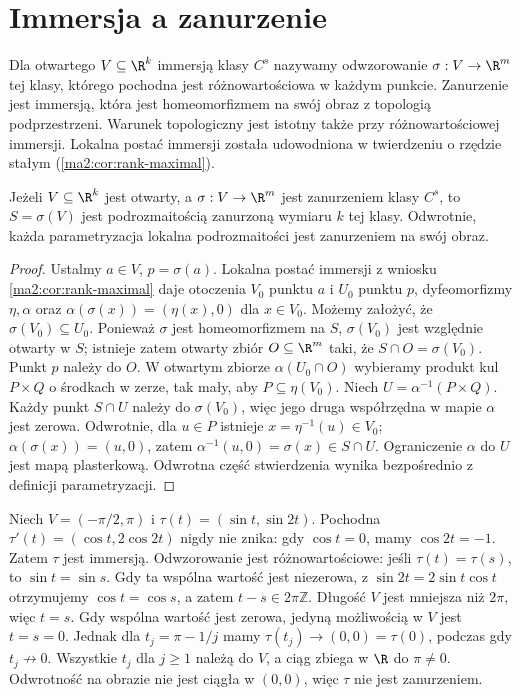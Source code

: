 \section{Immersja a zanurzenie}

Dla otwartego $V\subseteq\R^k$ immersją klasy $C^s$
nazywamy odwzorowanie $\sigma:V\to\R^m$ tej klasy,
którego pochodna jest różnowartościowa w każdym punkcie.
Zanurzenie jest immersją, która jest homeomorfizmem
na swój obraz z topologią podprzestrzeni. Warunek
topologiczny jest istotny także przy różnowartościowej
immersji. Lokalna postać immersji została udowodniona
w twierdzeniu o rzędzie stałym
(\ref{ma2:cor:rank-maximal}).

\begin{stwierdzenie}
\label{ma2:prop:embedding-image}
Jeżeli $V\subseteq\R^k$ jest otwarty, a
$\sigma:V\to\R^m$ jest zanurzeniem klasy $C^s$,
to $S=\sigma(V)$ jest podrozmaitością zanurzoną
wymiaru $k$ tej klasy. Odwrotnie, każda parametryzacja
lokalna podrozmaitości jest zanurzeniem na swój obraz.
\end{stwierdzenie}
\begin{proof}
Ustalmy $a\in V$, $p=\sigma(a)$. Lokalna postać
immersji z wniosku \ref{ma2:cor:rank-maximal} daje
otoczenia $V_0$ punktu $a$ i $U_0$ punktu $p$,
dyfeomorfizmy $\eta,\alpha$ oraz
$\alpha(\sigma(x))=(\eta(x),0)$ dla $x\in V_0$.
Możemy założyć, że $\sigma(V_0)\subseteq U_0$.
Ponieważ $\sigma$ jest homeomorfizmem na $S$,
$\sigma(V_0)$ jest względnie otwarty w $S$;
istnieje zatem otwarty zbiór $O\subseteq\R^m$
taki, że $S\cap O=\sigma(V_0)$. Punkt $p$ należy do $O$.
W otwartym zbiorze $\alpha(U_0\cap O)$ wybieramy
produkt kul $P\times Q$ o środkach w zerze, tak mały,
aby $P\subseteq\eta(V_0)$.
Niech $U=\alpha^{-1}(P\times Q)$.
Każdy punkt $S\cap U$ należy do $\sigma(V_0)$,
więc jego druga współrzędna w mapie $\alpha$ jest zerowa.
Odwrotnie, dla $u\in P$ istnieje $x=\eta^{-1}(u)\in V_0$;
$\alpha(\sigma(x))=(u,0)$, zatem
$\alpha^{-1}(u,0)=\sigma(x)\in S\cap U$.
Ograniczenie $\alpha$ do $U$ jest mapą plasterkową.
Odwrotna część stwierdzenia wynika bezpośrednio
z definicji parametryzacji.
\end{proof}

\begin{przyklad}
\label{ma2:ex:injective-nonembedding}
Niech $V=(-\pi/2,\pi)$ i $\tau(t)=(\sin t,\sin 2t)$.
Pochodna $\tau'(t)=(\cos t,2\cos 2t)$ nigdy nie
znika: gdy $\cos t=0$, mamy $\cos 2t=-1$.
Zatem $\tau$ jest immersją.
Odwzorowanie jest różnowartościowe: jeśli $\tau(t)=\tau(s)$,
to $\sin t=\sin s$. Gdy ta wspólna wartość jest
niezerowa, z $\sin 2t=2\sin t\cos t$ otrzymujemy
$\cos t=\cos s$, a zatem $t-s\in2\pi\mathbb Z$.
Długość $V$ jest mniejsza niż $2\pi$, więc $t=s$.
Gdy wspólna wartość jest zerowa, jedyną możliwością
w $V$ jest $t=s=0$.
Jednak dla $t_j=\pi-1/j$ mamy
$\tau(t_j)\to(0,0)=\tau(0)$, podczas gdy $t_j\not\to0$.
Wszystkie $t_j$ dla $j\ge1$ należą do $V$, a
ciąg zbiega w $\R$ do $\pi\ne0$.
Odwrotność na obrazie nie jest ciągła w $(0,0)$,
więc $\tau$ nie jest zanurzeniem.
\end{przyklad}

